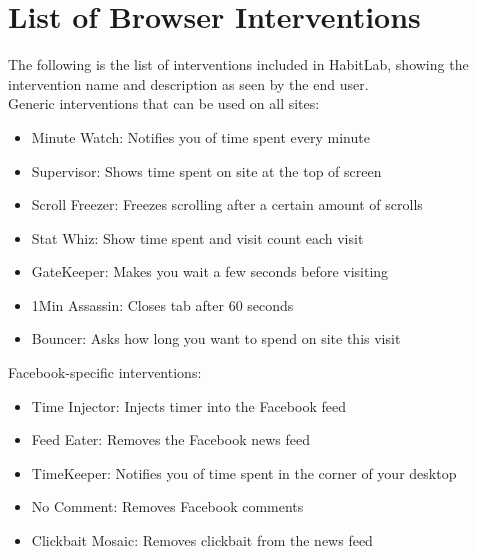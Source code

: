 \section{List of Browser Interventions}


The following is the list of interventions included in HabitLab, showing the intervention name and description as seen by the end user.\\

Generic interventions that can be used on all sites:
\begin{small}
\begin{itemize}
    \item Minute Watch: Notifies you of time spent every minute
    \item Supervisor: Shows time spent on site at the top of screen
    \item Scroll Freezer: Freezes scrolling after a certain amount of scrolls
    \item Stat Whiz: Show time spent and visit count each visit
    \item GateKeeper: Makes you wait a few seconds before visiting
    \item 1Min Assassin: Closes tab after 60 seconds
    \item Bouncer: Asks how long you want to spend on site this visit
\end{itemize}
\end{small}
\vspace{2mm}

Facebook-specific interventions:

\begin{itemize}
    \item Time Injector: Injects timer into the Facebook feed
    \item Feed Eater: Removes the Facebook news feed
    \item TimeKeeper: Notifies you of time spent in the corner of your desktop
    \item No Comment: Removes Facebook comments
    \item Clickbait Mosaic: Removes clickbait from the news feed
\end{itemize}

\vspace{2mm}

